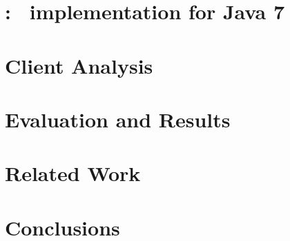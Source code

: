 \section{\intraj: \intracfg\  implementation for Java 7}
\label{sec:implementation}


\section{Client Analysis}
\label{sec:analysis}


\section{Evaluation and Results}
\label{sec:evaluation_results}


\section{Related Work}
\label{sec:related_works}


\section{Conclusions}
\label{sec:conclusions}



% 
% 





% 
